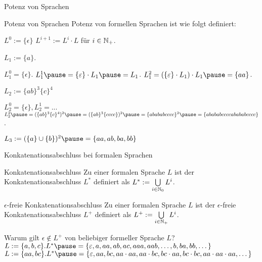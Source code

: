 \begin{frame}{Potenz von Sprachen}
	
	\begin{block}{Potenz von Sprachen}
		Potenz von formellen Sprachen ist wie folgt definiert:
		\begin{itemize}
			\pitem $L^0 := \{\epsilon\}$
			\pitem $L^{i+1} := L^i \cdot L$ für $i \in \mathbb{N}_+$.
		\end{itemize}
	\end{block}

	\begin{itemize}
		\pitem $L_1 := \{a\}$.
		\begin{itemize}
			\pitem $L_1^0 = \{\epsilon\}$. \pause $L_1^1 \pause = \{\epsilon\} \cdot L_1 \pause = L_1$.
			\pitem $L_1^2 = (\{\epsilon\} \cdot L_1) \cdot L_1 \pause = \{aa\}$.
		\end{itemize}
		\pitem $L_2 := \{ab\}^3\{c\}^4$
		\begin{itemize}
			\pitem $L_2^0 = \{\epsilon\}, L_2^1 = ...$
			\pitem $L_2^2 \pause = (\{ab\}^3\{c\}^4)^2 \pause = (\{ab\}^3\{cccc\})^2 \pause = \{abababcccc\}^2 \pause = \{abababccccabababcccc\}$.
		\end{itemize}
		\pitem $L_3 := (\{a\} \cup \{b\})^2 \pause = \{aa, ab, ba, bb\}$
	\end{itemize}

\end{frame}

\begin{frame}{Konkatenationsabschluss bei formalen Sprachen}
	\p
	\begin{block}{Konkatenationsabschluss}
		Zu einer formalen Sprache $L$ \pause ist der Konkatenationsabschluss $L^*$ definiert \pause als $L^* := \bigcup\limits_{i \in \mathbb{N}_0} L^i$.
	\end{block}
	\p
	\begin{block}{$\epsilon$-freie Konkatenationsabschluss}
		Zu einer formalen Sprache $L$ \pause ist der $\epsilon$-freie Konkatenationsabschluss $L^+$ definiert \pause als $L^+ := \bigcup\limits_{i \in \mathbb{N}_+} L^i$.
	\end{block}

	\begin{itemize}
		\pitem Warum gilt $\epsilon \notin L^+$ von beliebiger formeller Sprache $L$?
		\pitem $L := \{a, b, c\}.  L^* \pause = \{\epsilon, a, aa, ab, ac, aaa, aab, \dots, b, ba, bb, \dots \}$
		\pitem $L := \{aa, bc\}.  L^* \pause = \{\epsilon, aa, bc, aa\cdot aa, aa\cdot bc, bc \cdot aa, bc \cdot bc, aa \cdot aa \cdot aa, \dots \}$
	\end{itemize}
\end{frame}

